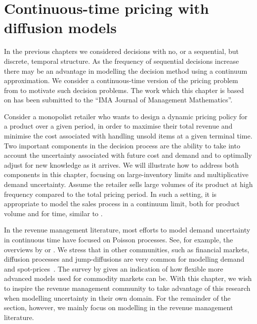 \documentclass[main.tex]{subfiles}
\begin{document}
\chapter{Continuous-time pricing with diffusion
  models}\label{ch:cts_control}

In the previous chapters we considered decisions with no, or a
sequential, but discrete, temporal structure.
As the frequency of sequential decisions increase there may be an
advantage in modelling the decision method using a continuum
approximation.
We consider a continuous-time version of the pricing problem from
 to motivate such decision problems.
The work which this chapter is based on has been submitted to
the ``IMA Journal of Management Mathematics''.

Consider a monopolist retailer who wants to design a dynamic pricing policy
for a product over a given period, in order to maximise their total
revenue and minimise the cost associated with handling unsold items
at a given terminal time.
Two important components in the decision process are the ability to
take into account the uncertainty associated with future cost and demand and to
optimally adjust for new knowledge as it arrives.
We will illustrate how to address both components in this chapter,
focusing on large-inventory limits and multiplicative demand
uncertainty.
Assume the retailer sells large volumes of its product at
high frequency compared to the total pricing period. In such a setting, it is
appropriate to model the sales process in a continuum limit, both for
product volume and for time, similar to \citet{kalish1983monopolist}.

In the revenue management literature, most efforts to model demand uncertainty in
continuous time have focused on Poisson
processes. See, for example, the overviews by \citet{bitran2003overview}
or \citet{aviv2012dynamic}.
We stress that in other communities, such as financial markets,
diffusion processes and jump-diffusions are very common for modelling
demand and spot-prices~\citep{benth2014stochastic}. The survey by \citet{carmona2014survey}
gives an indication of how flexible more advanced models used for commodity
markets can be. With this chapter, we wish to inspire the revenue
management community to take advantage of this research when modelling
uncertainty in their own domain. For the remainder of the section,
however, we mainly focus on modelling in the revenue management literature.
\end{document}
